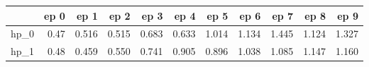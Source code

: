 \begin{tabular}{lrrrrrrrrrr}
\toprule
{} &  ep 0 &   ep 1 &   ep 2 &   ep 3 &   ep 4 &   ep 5 &   ep 6 &   ep 7 &   ep 8 &   ep 9 \\
\midrule
hp\_0 &  0.47 &  0.516 &  0.515 &  0.683 &  0.633 &  1.014 &  1.134 &  1.445 &  1.124 &  1.327 \\
hp\_1 &  0.48 &  0.459 &  0.550 &  0.741 &  0.905 &  0.896 &  1.038 &  1.085 &  1.147 &  1.160 \\
\bottomrule
\end{tabular}
